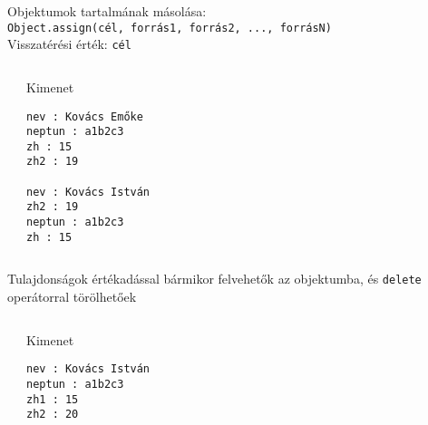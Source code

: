 \begin{frame}
  \small
  \begin{exampleblock}{}
    
  \end{exampleblock}
\end{frame}

\begin{frame}[fragile]
  Objektumok tartalmának másolása: \\
  \qquad \texttt{Object.assign(cél, forrás1, forrás2, ..., forrásN)}\\
  Visszatérési érték: \texttt{cél}
  \footnotesize
  \begin{columns}[T]
      \begin{exampleblock}{}
        
      \end{exampleblock}
      \begin{block}{Kimenet}
        \begin{verbatim}
nev : Kovács Emőke
neptun : a1b2c3
zh : 15
zh2 : 19

nev : Kovács István
zh2 : 19
neptun : a1b2c3
zh : 15
\end{verbatim}
      \end{block}
  \end{columns}
\end{frame}

\begin{frame}[fragile]
  Tulajdonságok értékadással bármikor felvehetők az objektumba, és \texttt{delete} operátorral törölhetőek
  \vfill
  \footnotesize
  \begin{columns}[T]
      \begin{exampleblock}{}
        
      \end{exampleblock}
      \begin{block}{Kimenet}
        \begin{verbatim}
nev : Kovács István
neptun : a1b2c3
zh1 : 15
zh2 : 20
\end{verbatim}
      \end{block}
  \end{columns}
\end{frame}

